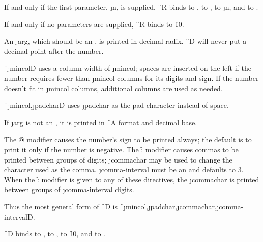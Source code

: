 If and only if the first parameter, \j{n}, is supplied,
\f{~R} binds
      to ,
      to , 
      to \j{n},
 and  to .

If and only if no parameters are supplied,
\f{~R} binds  to \f{10}.

\endsubsubsection%



An \j{arg}, which should be an , 
is printed in decimal radix.
\f{~D} will never put a decimal point after the number.

\f{~\j{mincol}D} uses 
a column width of \j{mincol}; spaces are inserted on
the left if the number requires fewer than \j{mincol} columns for its digits
and sign.  If the number doesn't fit in \j{mincol} columns, additional columns
are used as needed.

\f{~\j{mincol},\j{padchar}D} uses \j{padchar} as the pad character
instead of space.

If \j{arg} is not an , it is printed in \f{~A} format and decimal base.

The \f{@} modifier causes the number's sign to be printed always; the default
is to print it only if the number is negative.
The \f{:} modifier causes commas to be printed between groups of digits;
\j{commachar} may be used to change the character used as the comma.
\j{comma-interval} 
must be an  and defaults to 3.  When the \f{:} 
modifier is given to any of
these directives, the \j{commachar} 
is printed between groups of \j{comma-interval}
digits.

Thus the most general form of \f{~D} is
\f{~\j{mincol},\j{padchar},\j{commachar},\j{comma-interval}D}.

\f{~D} binds
      to ,
      to ,
      to \f{10},
 and  to .


